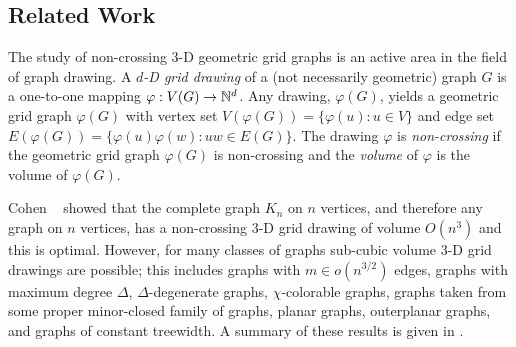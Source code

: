 \documentclass{patmorin}
\begin{document}
\subsection{Related Work}

The study of non-crossing 3-D geometric grid graphs is an
active area in the field of graph drawing.  A \emph{$d$-D
grid drawing} of a (not necessarily geometric) graph $G$ is a
one-to-one mapping $\varphi:V(G)\rightarrow \mathbb{N}^d$.  Any drawing,
$\varphi(G)$, yields a geometric grid graph $\varphi(G)$ with
vertex set $V(\varphi(G))=\{\varphi(u):u\in V\}$ and edge set
$E(\varphi(G))=\{\varphi(u)\varphi(w):uw\in E(G)\}$.  The drawing
$\varphi$ is \emph{non-crossing} if the geometric grid graph $\varphi(G)$
is non-crossing and the \emph{volume} of $\varphi$ is the volume of
$\varphi(G)$.

Cohen \etal~\cite{cohen.eades.ea:three-dimensional} showed that the
complete graph $K_n$ on $n$ vertices, and therefore any graph on $n$
vertices, has a non-crossing 3-D grid drawing of volume $O(n^3)$ and this
is optimal.  However, for many classes of graphs sub-cubic volume 3-D
grid drawings are possible; this includes graphs with $m\in o(n^{3/2})$
edges, graphs with maximum degree $\Delta$, $\Delta$-degenerate graphs,
$\chi$-colorable graphs, graphs taken from some proper minor-closed family
of graphs, planar graphs, outerplanar graphs, and graphs of constant
treewidth.  A summary of these results is given in .
\end{document}
